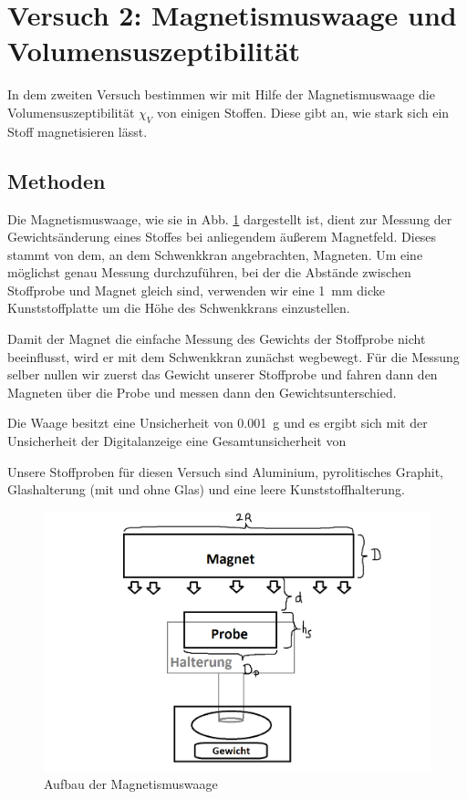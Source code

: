 \documentclass[11pt,a4paper,titlepage, ngerman]{article}
\begin{document}
	\section{Versuch 2: Magnetismuswaage  und Volumensuszeptibilität}		
		
		In dem zweiten Versuch bestimmen wir mit Hilfe der Magnetismuswaage die Volumensuszeptibilität $\chi _V$ von einigen Stoffen. Diese gibt an, wie stark sich ein Stoff magnetisieren lässt.		
		
		\subsection*{Methoden} 
		
			Die Magnetismuswaage, wie sie in Abb. \ref{fig:Magnetismuswaage} dargestellt ist, dient zur Messung der Gewichtsänderung eines Stoffes bei anliegendem äußerem Magnetfeld. Dieses stammt von dem, an dem Schwenkkran angebrachten, Magneten.
			Um eine möglichst genau Messung durchzuführen, bei der die Abstände zwischen Stoffprobe und Magnet gleich sind, verwenden wir eine \SI{1}{\mm} dicke Kunststoffplatte um die Höhe des Schwenkkrans einzustellen.
			
			Damit der Magnet die einfache Messung des Gewichts der Stoffprobe nicht beeinflusst, wird er mit dem Schwenkkran zunächst wegbewegt.
			Für die Messung selber nullen wir zuerst das Gewicht unserer Stoffprobe und fahren dann den Magneten über die Probe und messen dann den Gewichtsunterschied.
			
			Die Waage besitzt eine Unsicherheit von \SI{0,001}{\g} und es ergibt sich mit der Unsicherheit der Digitalanzeige eine Gesamtunsicherheit von %
			
			Unsere Stoffproben für diesen Versuch sind Aluminium, pyrolitisches Graphit, Glashalterung (mit und ohne Glas) und eine leere Kunststoffhalterung.
			
			\begin{figure}
				\includegraphics[width=\textwidth]{SkizzeMagnetwaage.png}
				\caption{Aufbau der Magnetismuswaage}
				\label{fig:Magnetismuswaage}
			\end{figure}
		
\end{document}
